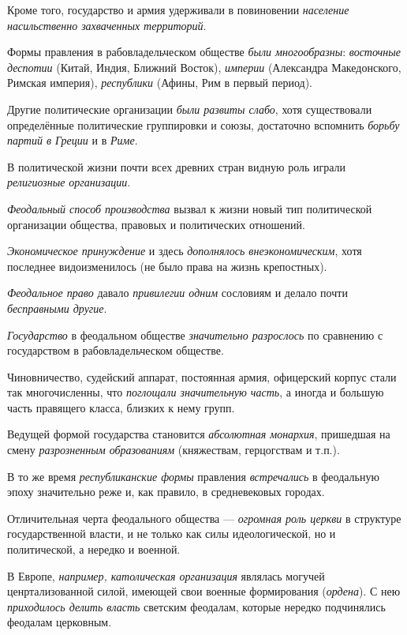 \documentclass[a4paper,14pt,russian]{extreport}
\begin{document}
Кроме того, государство и армия удерживали в повиновении \emph{население насильственно захваченных территорий}.

Формы правления в рабовладельческом обществе \emph{были многообразны}: \emph{восточные деспотии} (Китай, Индия, Ближний Восток), \emph{империи} (Александра Македонского, Римская империя), \emph{республики} (Афины, Рим в первый период).

Другие политические организации \emph{были развиты слабо}, хотя существовали определённые политические группировки и союзы, достаточно вспомнить \emph{борьбу партий в Греции} и в \emph{Риме}.

В политической жизни почти всех древних стран видную роль играли \emph{религиозные организации}.

\emph{Феодальный способ производства} вызвал к жизни новый тип политической организации общества, правовых и политических отношений.

\emph{Экономическое принуждение} и здесь \emph{дополнялось внеэкономическим}, хотя последнее видоизменилось (не было права на жизнь крепостных).

\emph{Феодальное право} давало \emph{привилегии одним} сословиям и делало почти \emph{бесправными другие}.

\emph{Государство} в феодальном обществе \emph{значительно разрослось} по сравнению с государством в рабовладельческом обществе.

Чиновничество, судейский аппарат, постоянная армия, офицерский корпус стали так многочисленны, что \emph{поглощали значительную часть}, а иногда и большую часть правящего класса, близких к нему групп.

Ведущей формой государства становится \emph{абсолютная монархия}, пришедшая на смену \emph{разрозненным образованиям} (княжествам, герцогствам и т.п.).

В то же время \emph{республиканские формы} правления \emph{встречались} в феодальную эпоху значительно реже и, как правило, в средневековых городах.

Отличительная черта феодального общества --- \emph{огромная роль церкви} в структуре государственной власти, и не только как силы идеологической, но и политической, а нередко и военной.

В Европе, \emph{например, католическая организация} являлась могучей ценртализованной силой, имеющей свои военные формирования (\emph{ордена}). С нею \emph{приходилось делить власть} светским феодалам, которые нередко подчинялись феодалам церковным.
\end{document}
